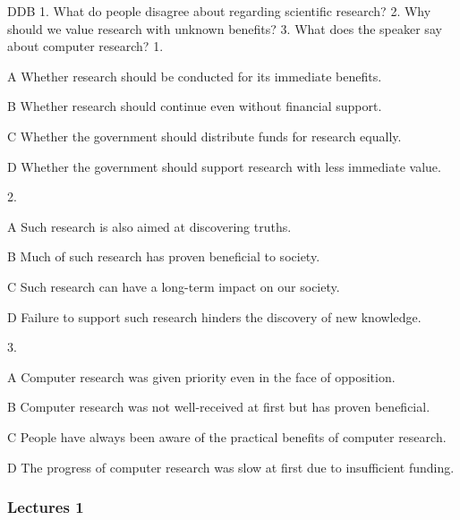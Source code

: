 \begin{enumerate}
	DDB
	1. What do people disagree about regarding scientific research?
	2. Why should we value research with unknown benefits?
	3. What does the speaker say about computer research?
	1.
	
	A
	Whether research should be conducted for its immediate benefits.
	
	B
	Whether research should continue even without financial support.
	
	C
	Whether the government should distribute funds for research equally.
	
	D
	Whether the government should support research with less immediate value.
	
	2.
	
	A
	Such research is also aimed at discovering truths.
	
	B
	Much of such research has proven beneficial to society.
	
	C
	Such research can have a long-term impact on our society.
	
	D
	Failure to support such research hinders the discovery of new knowledge.
	
	3.
	
	A
	Computer research was given priority even in the face of opposition.
	
	B
	Computer research was not well-received at first but has proven beneficial.
	
	C
	People have always been aware of the practical benefits of computer research.
	
	D
	The progress of computer research was slow at first due to insufficient funding.
\end{enumerate}

\subsubsection{Lectures 1}

